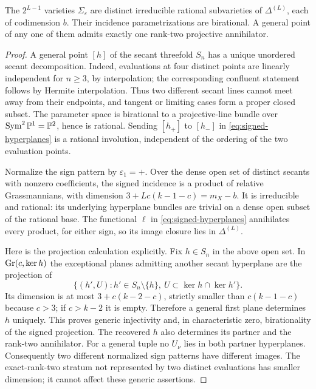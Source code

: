 \begin{lemma}\label{lem:signed-secants}
The $2^{L-1}$ varieties $\Sigma_\varepsilon$ are distinct irreducible rational subvarieties of $\Delta^{(L)}$, each of codimension $b$. Their incidence parametrizations are birational. A general point of any one of them admits exactly one rank-two projective annihilator.
\end{lemma}
\begin{proof}
A general point $[h]$ of the secant threefold $S_n$ has a unique unordered secant decomposition. Indeed, evaluations at four distinct points are linearly independent for $n\ge3$, by interpolation; the corresponding confluent statement follows by Hermite interpolation. Thus two different secant lines cannot meet away from their endpoints, and tangent or limiting cases form a proper closed subset. The parameter space is birational to a projective-line bundle over $\operatorname{Sym}^2\mathbb P^1=\mathbb P^2$, hence is rational. Sending $[h_+]$ to $[h_-]$ in \eqref{eq:signed-hyperplanes} is a rational involution, independent of the ordering of the two evaluation points.

Normalize the sign pattern by $\varepsilon_1=+$. Over the dense open set of distinct secants with nonzero coefficients, the signed incidence is a product of relative Grassmannians, with dimension $3+Lc(k-1-c)=m_X-b$. It is irreducible and rational: its underlying hyperplane bundles are trivial on a dense open subset of the rational base. The functional $\ell$ in \eqref{eq:signed-hyperplanes} annihilates every product, for either sign, so its image closure lies in $\Delta^{(L)}$.

Here is the projection calculation explicitly. Fix $h\in S_n$ in the above open set. In $\operatorname{Gr}(c,\ker h)$ the exceptional planes admitting another secant hyperplane are the projection of
\[
 \{(h',U):h'\in S_n\setminus\{h\},\
                      U\subset\ker h\cap\ker h'\}.
\]
Its dimension is at most $3+c(k-2-c)$, strictly smaller than $c(k-1-c)$ because $c>3$; if $c>k-2$ it is empty. Therefore a general first plane determines $h$ uniquely. This proves generic injectivity and, in characteristic zero, birationality of the signed projection. The recovered $h$ also determines its partner and the rank-two annihilator. For a general tuple no $U_\nu$ lies in both partner hyperplanes. Consequently two different normalized sign patterns have different images. The exact-rank-two stratum not represented by two distinct evaluations has smaller dimension; it cannot affect these generic assertions.
\end{proof}

